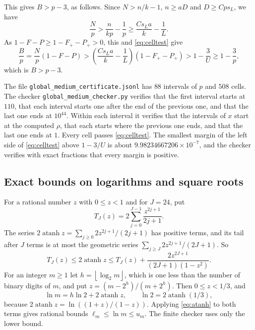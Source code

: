 \documentclass[11pt]{article}
\DeclareMathOperator{\atanh}{atanh}
\newcommand{\floor}[1]{\left\lfloor#1\right\rfloor}
\begin{document}
This gives $B>p-3$, as follows. Since $N>n/k-1$, $n\ge aD$ and
$D\ge Cps_L$, we have
\begin{equation*}
 \frac Np>\frac n{kp}-\frac1p\ge\frac{Cs_La}{k}-\frac1L.
\end{equation*}
As $1-F-P\ge1-F_+-P_+>0$, this and \eqref{eq:celltest} give
\begin{equation*}
 \frac Bp=\frac Np(1-F-P)
 >\left(\frac{Cs_La}{k}-\frac1L\right)(1-F_+-P_+)
 >1-\frac3U\ge1-\frac3p,
\end{equation*}
which is $B>p-3$.

The file \texttt{global\_medium\_certificate.jsonl} has $88$ intervals of $p$
and $508$ cells. The checker \texttt{global\_medium\_checker.py} verifies
that the first interval starts at $110$, that each interval starts one after
the end of the previous one, and that the last one ends at $10^{44}$. Within
each interval it verifies that the intervals of $x$ start at the computed
$\rho$, that each starts where the previous one ends, and that the last one
ends at $1$. Every cell passes \eqref{eq:celltest}. The smallest margin of
the left side of \eqref{eq:celltest} above $1-3/U$ is about
$9.98234667206\times10^{-7}$, and the checker verifies with exact fractions
that every margin is positive.

\subsection{Exact bounds on logarithms and square roots}\label{sec:enclosures}

For a rational number $z$ with $0\le z<1$ and for $J=24$, put
\begin{equation*}
 T_J(z)=2\sum_{j=0}^{J-1}\frac{z^{2j+1}}{2j+1}.
\end{equation*}
The series $2\atanh z=\sum_{j\ge0}2z^{2j+1}/(2j+1)$ has positive terms, and
its tail after $J$ terms is at most the geometric series
$\sum_{j\ge J}2z^{2j+1}/(2J+1)$. So
\begin{equation}\label{eq:atanh}
 T_J(z)\le2\atanh z
 \le T_J(z)+\frac{2z^{2J+1}}{(2J+1)(1-z^2)}.
\end{equation}
For an integer $m\ge1$ let $h=\floor{\log_2m}$, which is one less than the
number of binary digits of $m$, and put $z=(m-2^h)/(m+2^h)$. Then
$0\le z<1/3$, and
\begin{equation*}
 \ln m=h\ln2+2\atanh z,
 \qquad \ln2=2\atanh(1/3),
\end{equation*}
because $2\atanh z=\ln((1+z)/(1-z))$. Applying \eqref{eq:atanh} to both
terms gives rational bounds $\ell_m\le\ln m\le u_m$. The finite checker uses
only the lower bound.
\end{document}
